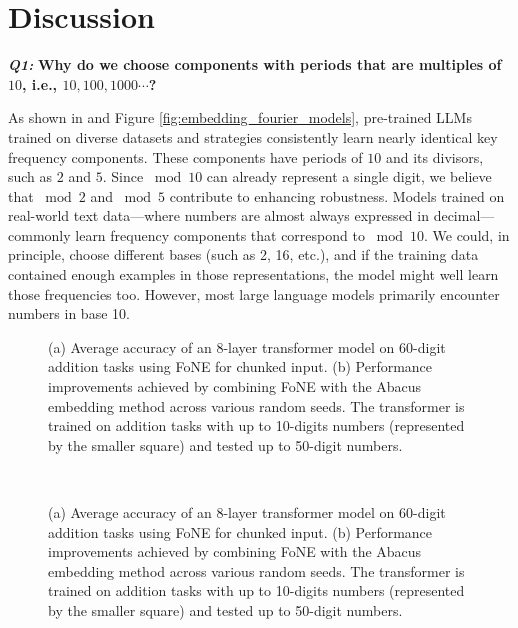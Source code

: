 \section{Discussion}\label{sec:discussion}

\textit{\textbf{Q1:}} \textbf{Why do we choose components with periods that are multiples of $10$, i.e., $10, 100, 1000 \cdots$?}


As shown in \citet{zhou2024pre} and Figure \ref{fig:embedding_fourier_models}, pre-trained LLMs trained on diverse datasets and strategies consistently learn nearly identical key frequency components. These components have periods of $10$ and its divisors, such as $2$ and $5$. Since $\bmod 10$ can already represent a single digit, we believe that $\bmod 2$ and $\bmod 5$ contribute to enhancing robustness.
Models trained on real-world text data—where numbers are almost always expressed in decimal—commonly learn frequency components that correspond to \(\bmod 10\).
We could, in principle, choose different bases (such as 2, 16, etc.), and if the training data contained enough examples in those representations, the model might well learn those frequencies too. However, most large language models primarily encounter numbers in base 10. 

\ifdefined\isarxiv
\begin{figure}[t]
  \centering
  \caption{
(a) Average accuracy of an 8-layer transformer model on 60-digit addition tasks using FoNE for chunked input.
(b) Performance improvements achieved by combining FoNE with the Abacus embedding method across various random seeds. The transformer is trained on addition tasks with up to 10-digits  numbers (represented by the smaller square)  and tested up to 50-digit numbers.} 
    \label{fig:lengen} 
\end{figure}
\else
\begin{figure}[t]
  \centering
    \vspace{-3mm}\\
  \vspace{-3mm}
  \caption{
(a) Average accuracy of an 8-layer transformer model on 60-digit addition tasks using FoNE for chunked input.
(b) Performance improvements achieved by combining FoNE with the Abacus embedding method across various random seeds. The transformer is trained on addition tasks with up to 10-digits  numbers (represented by the smaller square)  and tested up to 50-digit numbers.} 
\vspace{-3mm}
    \label{fig:lengen} 
\end{figure}
\fi



